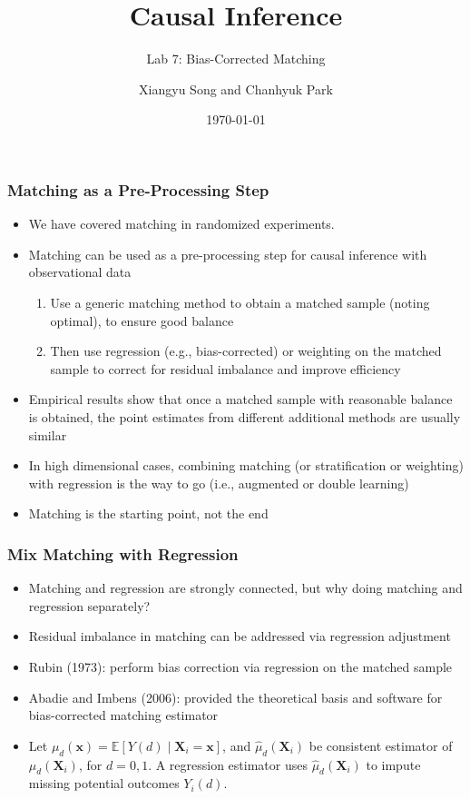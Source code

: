 \documentclass[10pt, handout]{beamer}
\title[Causal Lab]{Causal Inference}
\subtitle[]{Lab 7: Bias-Corrected Matching}
\author[Song and Park]{Xiangyu Song and Chanhyuk Park}
\institute{Washington University in St. Louis}
\date{\today}
\begin{document}
\maketitle

\begin{frame}
  \frametitle{Matching as a Pre-Processing Step}

  \begin{itemize}
    \item We have covered matching in randomized experiments.
    \item Matching can be used as a pre-processing step for causal inference with observational data
    \begin{enumerate}
      \item Use a generic matching method to obtain a matched sample (noting optimal), to ensure good balance
      \item Then use regression (e.g., bias-corrected) or weighting on the matched sample to correct for residual imbalance and improve efficiency
    \end{enumerate}
    \item Empirical results show that once a matched sample with reasonable balance is obtained, the point estimates from different additional methods are usually similar
    \item In high dimensional cases, combining matching (or stratification or weighting) with regression is the way to go (i.e., augmented or double learning)
    \item Matching is the starting point, not the end
  \end{itemize}

\end{frame}

\begin{frame}
  \frametitle{Mix Matching with Regression}

  \begin{itemize}
    \item Matching and regression are strongly connected, but why doing matching and regression separately?
    \item Residual imbalance in matching can be addressed via regression adjustment
    \item Rubin (1973): perform bias correction via regression on the matched sample
    \item Abadie and Imbens (2006): provided the theoretical basis and software for bias-corrected matching estimator
    \item Let $\mu_{d} (\mathbf{x}) = \mathbb{E} \left[ Y(d) \mid \mathbf{X}_i = \mathbf{x} \right]$, and $\hat{\mu}_d (\mathbf{X}_i)$ be consistent estimator of $\mu_d(\mathbf{X}_i)$, for $d = 0, 1$. A regression estimator uses $\hat{\mu}_d(\mathbf{X}_i)$ to impute missing potential outcomes $Y_i(d)$. 
  \end{itemize}

\end{frame}
\end{document}
